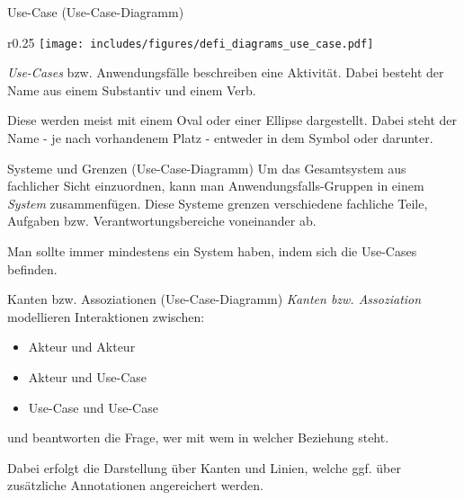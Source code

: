 \begin{diag}{Use-Case (Use-Case-Diagramm)}
    \begin{wrapfigure}{r}{0.25\textwidth}
        \centering
        \texttt{[image: includes/figures/defi\_diagrams\_use\_case.pdf]}
    \end{wrapfigure}
    \emph{Use-Cases} bzw. Anwendungsfälle beschreiben eine Aktivität.
    Dabei besteht der Name aus einem Substantiv und einem Verb.

    Diese werden meist mit einem Oval oder einer Ellipse dargestellt.
    Dabei steht der Name - je nach vorhandenem Platz - entweder in dem Symbol oder darunter.

    \vspace{8em}
\end{diag}

\begin{diag}{Systeme und Grenzen (Use-Case-Diagramm)}
    Um das Gesamtsystem aus fachlicher Sicht einzuordnen, kann man Anwendungsfalls-Gruppen in einem \emph{System} zusammenfügen.
    Diese Systeme grenzen verschiedene fachliche Teile, Aufgaben bzw. Verantwortungsbereiche voneinander ab.

    Man sollte immer mindestens ein System haben, indem sich die Use-Cases befinden.

\end{diag}

\begin{diag}{Kanten bzw. Assoziationen (Use-Case-Diagramm)}
    \emph{Kanten bzw. Assoziation} modellieren Interaktionen zwischen:
    \begin{itemize}
        \item Akteur und Akteur
        \item Akteur und Use-Case
        \item Use-Case und Use-Case
    \end{itemize}
    und beantworten die Frage, wer mit wem in welcher Beziehung steht.

    Dabei erfolgt die Darstellung über Kanten und Linien, welche ggf. über zusätzliche Annotationen angereichert werden.
\end{diag}

